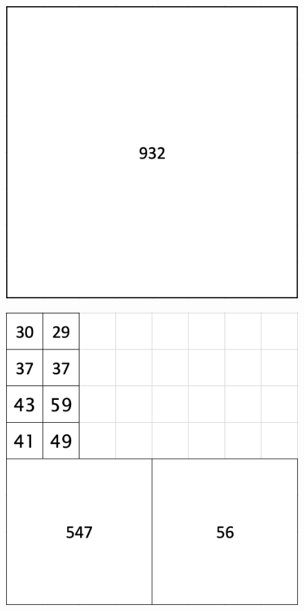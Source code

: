 \begin{figure}[ht!]
  \centering
  \begin{minipage}[b]{0.22\linewidth}
    \includegraphics[width=\linewidth]{images/Fig3a.png}
    \subcaption{}
    \label{fig:Fig3a}
  \end{minipage}
  \begin{minipage}[b]{0.22\linewidth}
    \includegraphics[width=\linewidth]{images/Fig3b.png}

\end{minipage}
\end{figure}
